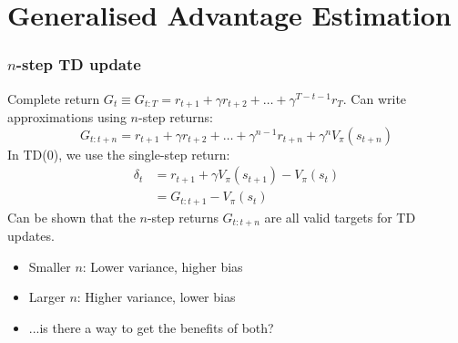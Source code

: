 \section{Generalised Advantage Estimation}



\begin{frame}
    \frametitle{$n$-step TD update}
    Complete return $G_t \equiv G_{t:T} = r_{t+1} + \gamma r_{t+2} + \ldots + \gamma^{T-t-1} r_T$.
    Can write approximations using $n$-step returns:
    $$
    G_{t:t+n} = r_{t+1} + \gamma r_{t+2} + \ldots + \gamma^{n-1} r_{t+n}  + \gamma^{n} V_\pi(s_{t+n})
    $$
    \pause
    In TD(0), we use the single-step return:
    \begin{align*}
        \delta_t &=  r_{t+1} + \gamma V_\pi(s_{t+1}) - V_\pi(s_t) \\
      &= G_{t:t+1}  - V_\pi(s_t)
    \end{align*}
    \pause
    Can be shown that the $n$-step returns $G_{t:t+n}$ are all valid targets for TD updates.
    \begin{itemize}
        \item Smaller $n$: Lower variance, higher bias
        \item Larger $n$: Higher variance, lower bias
        \item ...is there a way to get the benefits of both?
    \end{itemize}
\end{frame}



